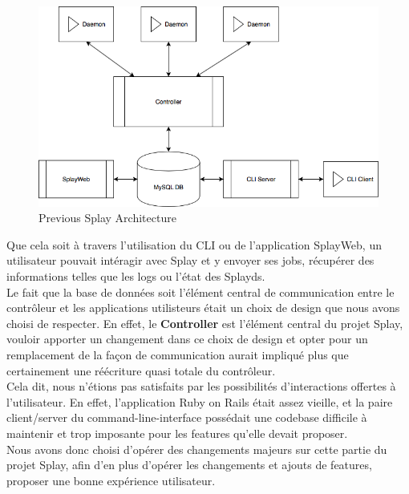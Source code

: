 \documentclass{eplmastersthesis}
\begin{document}
        \begin{figure}[H]
          \centering
          \includegraphics[scale=0.6]{figures/prev_arch.png}
          \caption{\label{prev_arch} Previous Splay Architecture}
        \end{figure}

        Que cela soit à travers l'utilisation du CLI ou de l'application SplayWeb,
        un utilisateur pouvait intéragir avec Splay et y envoyer ses jobs, récupérer
        des informations telles que les logs ou l'état des Splayds.\\

        Le fait que la base de données soit l'élément central de communication entre
        le contrôleur et les applications utilisteurs était un choix de design
        que nous avons choisi de respecter. En effet, le \textbf{Controller} est
        l'élément central du projet Splay, vouloir apporter un changement dans ce choix
        de design et opter pour un remplacement de la façon de communication aurait
        impliqué plus que certainement une réécriture quasi totale du contrôleur.\\

        Cela dit, nous n'étions pas satisfaits par les possibilités d'interactions
        offertes à l'utilisateur. En effet, l'application Ruby on Rails était assez
        vieille, et la paire client/server du command-line-interface possédait une
        codebase difficile à maintenir et trop imposante pour les features qu'elle
        devait proposer.\\

        Nous avons donc choisi d'opérer des changements majeurs sur cette partie
        du projet Splay, afin d'en plus d'opérer les changements et ajouts de features,
        proposer une bonne expérience utilisateur.
\end{document}
